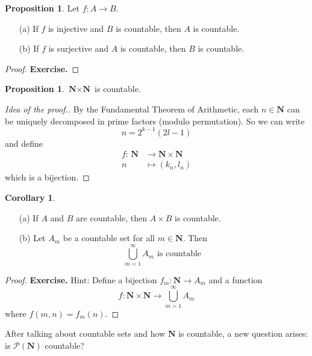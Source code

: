 \documentclass[12pt,a4paper]{article}
\theoremstyle{definition}
\newtheorem{corollary}[theorem]{Corollary}
\newtheorem{proposition}[theorem]{Proposition}
\begin{document}
\begin{proposition}
	Let $f : A \longrightarrow B$.
	\begin{itemize}
		\item[(a)] If $f$ is injective and $B$ is countable, then $A$ is countable.
		\item[(b)] If $f$ is surjective and $A$ is countable, then $B$ is countable.
	\end{itemize}
\end{proposition}

\begin{proof}
	\textbf{Exercise.}
\end{proof}

\begin{proposition}
	$\textbf{N} \times \textbf{N}$ is countable.
\end{proposition}

\begin{proof}[Idea of the proof.]
	By the Fundamental Theorem of Arithmetic, each $n \in \textbf{N}$ can be uniquely decomposed in prime factors (modulo permutation). So we can write
	\[ n = 2^{k-1} (2l-1) \]
	and define
	\begin{equation*}
		\begin{aligned}
			f : \, \textbf{N} & \longrightarrow \textbf{N} \times \textbf{N} \\
			n & \longmapsto (k_n, l_n)
		\end{aligned}
	\end{equation*}
	which is a bijection.
\end{proof}

\begin{corollary} \hfill
	\begin{itemize}
		\item[(a)] If $A$ and $B$ are countable, then $A \times B$ is countable.
		\item[(b)] Let $A_m$ be a countable set for all $m \in \textbf{N}$. Then \[ \bigcup_{m=1}^\infty A_m \text{ is countable } \]
	\end{itemize}
\end{corollary}

\begin{proof}
	\textbf{Exercise.} Hint: Define a bijection $f_m : \textbf{N} \longrightarrow A_m$ and a function \[f : \textbf{N} \times \textbf{N} \longrightarrow \bigcup_{m=1}^\infty A_m\] where $f(m,n) = f_m(n)$.
\end{proof}

After talking about countable sets and how $\textbf{N}$ is countable, a new question arises: is $\mathcal{P}(\textbf{N})$ countable?
\end{document}
